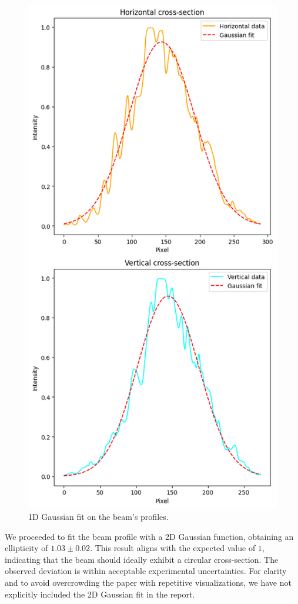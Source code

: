 \documentclass[prl,twocolumn]{revtex4-1}
\begin{document}
\begin{figure}[!h]
    \centering
    \includegraphics[width=0.87\linewidth]{Images/1d_gaussian_fit.png}
    \caption{1D Gaussian fit on the beam's profiles.}
    \label{fig:1d_gaussian_fit}
\end{figure}

We proceeded to fit the beam profile with a 2D Gaussian function, obtaining an ellipticity of \( 1.03 \pm 0.02 \). This result aligns with the expected value of \( 1 \), indicating that the beam should ideally exhibit a circular cross-section. The observed deviation is within acceptable experimental uncertainties. For clarity and to avoid overcrowding the paper with repetitive visualizations, we have not explicitly included the 2D Gaussian fit in the report. 
\end{document}
